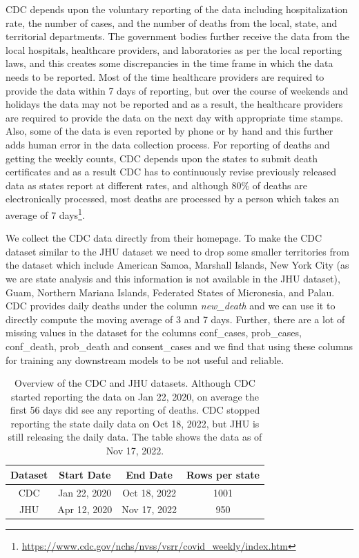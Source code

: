 \documentclass[11pt,twocolumn,letterpaper]{article}
\begin{document}
CDC depends upon the voluntary reporting of the data including hospitalization rate, the number of cases, and the number of deaths from the local, state, and territorial departments. The government bodies further receive the data from the local hospitals, healthcare providers, and laboratories as per the local reporting laws, and this creates some discrepancies in the time frame in which the data needs to be reported. Most of the time healthcare providers are required to provide the data within 7 days of reporting, but over the course of weekends and holidays the data may not be reported and as a result, the healthcare providers are required to provide the data on the next day with appropriate time stamps. Also, some of the data is even reported by phone or by hand and this further adds human error in the data collection process. For reporting of deaths and getting the weekly counts, CDC depends upon the states to submit death certificates and as a result CDC has to continuously revise previously released data as states report at different rates, and although 80\% of deaths are electronically processed, most deaths are processed by a person which takes an average of 7 days\footnote{\href{https://www.cdc.gov/nchs/nvss/vsrr/covid_weekly/index.htm}{https://www.cdc.gov/nchs/nvss/vsrr/covid\_weekly/index.htm}}.

We collect the CDC data directly from their homepage. To make the CDC dataset similar to the JHU dataset we need to drop some smaller territories from the dataset which include American Samoa, Marshall Islands, New York City (as we are state analysis and this information is not available in the JHU dataset), Guam, Northern Mariana Islands, Federated States of Micronesia, and Palau. CDC provides daily deaths under the column \emph{new\_death} and we can use it to directly compute the moving average of 3 and 7 days. Further, there are a lot of missing values in the dataset for the columns conf\_cases, prob\_cases, conf\_death, prob\_death and consent\_cases and we find that using these columns for training any downstream models to be not useful and reliable.

\begin{table}
    \centering
    \begin{tabular}{cccc}
        \toprule
        Dataset & Start Date & End Date & Rows per state \\
        \midrule
        CDC & Jan 22, 2020 & Oct 18, 2022 & 1001 \\
        JHU & Apr 12, 2020 & Nov 17, 2022 & 950 \\
        \bottomrule
    \end{tabular}
    \caption{Overview of the CDC and JHU datasets. Although CDC started reporting the data on Jan 22, 2020, on average the first 56 days did see any reporting of deaths. CDC stopped reporting the state daily data on Oct 18, 2022, but JHU is still releasing the daily data. The table shows the data as of Nov 17, 2022.}
    \label{table1}
\end{table}
\end{document}
